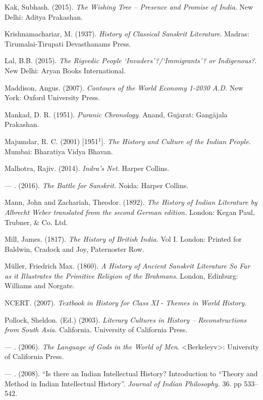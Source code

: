 \begin{thebibliography}{99}
  Kak, Subhash. (2015). \textit{The Wishing Tree – Presence and Promise of India}. New Delhi: Aditya Prakashan.

  Krishnamachariar, M. (1937). \textit{History of Classical Sanskrit Literature}. Madras: Tirumalai-Tirupati Devasthanams Press.

  Lal, B.B. (2015). \textit{The Rigvedic People ‘Invaders’?/‘Immigrants’? or Indigenous?}. New Delhi: Aryan Books International.

  Maddison, Angus. (2007). \textit{Contours of the World Economy 1-2030 A.D.} New York: Oxford University Press.

  Mankad, D. R. (1951). \textit{Puranic Chronology}. Anand, Gujarat: Gangājala Prakashan.

  Majumdar, R. C. (2001) [1951$^{1}$]. \textit{The History and Culture of the Indian People}. Mumbai: Bharatiya Vidya Bhavan.

  Malhotra, Rajiv. (2014). \textit{Indra’s Net.} Harper Collins.

  — . (2016). \textit{The Battle for Sanskrit.} Noida: Harper Collins.

  Mann, John and Zachariah, Theodor. (1892). \textit{The History of Indian Literature by Albrecht Weber translated from the second German edition.} London: Kegan Paul, Trubner, \& Co. Ltd.

  Mill, James. (1817). \textit{The History of British India.} Vol I. London: Printed for Baldwin, Cradock and Joy, Paternoster Row.

  Müller, Friedrich Max. (1860). \textit{A History of Ancient Sanskrit Literature So Far as it Illustrates the Primitive Religion of the Brahmans}. London, Edinburg: Williams and Norgate.

  NCERT. (2007). \textit{Textbook in History for Class XI} - \textit{Themes in World History.}

  Pollock, Sheldon. (Ed.) (2003). \textit{Literary Cultures in History – Reconstructions from South Asia.} California\textit{.} University of California Press.

  — . (2006). \textit{The Language of Gods in the World of Men}. \textless Berkeleyv\textgreater : University of California Press.

  — . (2008). “Is there an Indian Intellectual History? Introduction to “Theory and Method in Indian Intellectual History”. \textit{Journal of Indian Philosophy.} 36. pp 533–542.


\end{thebibliography}
